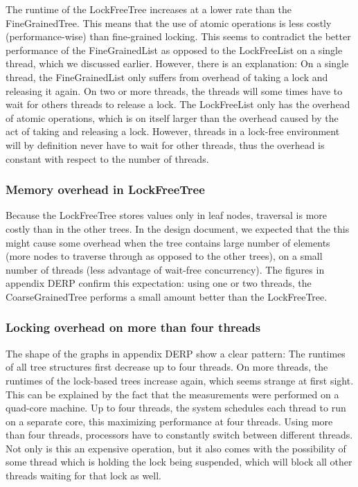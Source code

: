 \documentclass[a4paper]{article}
\begin{document}
The runtime of the LockFreeTree increases at a lower rate than the
FineGrainedTree. This means that the use of atomic operations is less costly
(performance-wise) than fine-grained locking. This seems to contradict the
better performance of the FineGrainedList as opposed to the LockFreeList on a
single thread, which we discussed earlier. However, there is an explanation:
On a single thread, the FineGrainedList only suffers from overhead of taking a
lock and releasing it again. On two or more threads, the threads will
some times have to wait for others threads to release a lock. The LockFreeList
only has the overhead of atomic operations, which is on itself larger than the
overhead caused by the act of taking and releasing a lock. However, threads in
a lock-free environment will by definition never have to wait for other
threads, thus the overhead is constant with respect to the number of threads.

\subsubsection*{Memory overhead in LockFreeTree}

Because the LockFreeTree stores values only in leaf nodes, traversal is more
costly than in the other trees. In the design document, we expected that the
this might cause some overhead when the tree contains large number of elements
(more nodes to traverse through as opposed to the other trees), on a small
number of threads (less advantage of wait-free concurrency). The figures in
appendix DERP confirm this expectation: using one or two threads, the
CoarseGrainedTree performs a small amount better than the LockFreeTree.

\subsubsection*{Locking overhead on more than four threads}

The shape of the graphs in appendix DERP show a clear pattern: The runtimes of
all tree structures first decrease up to four threads. On more threads, the
runtimes of the lock-based trees increase again, which seems strange at first
sight. This can be explained by the fact that the measurements were performed
on a quad-core machine. Up to four threads, the system schedules each thread to
run on a separate core, this maximizing performance at four threads. Using more
than four threads, processors have to constantly switch between different
threads. Not only is this an expensive operation, but it also comes with the
possibility of some thread which is holding the lock being suspended, which
will block all other threads waiting for that lock as well.
\end{document}

